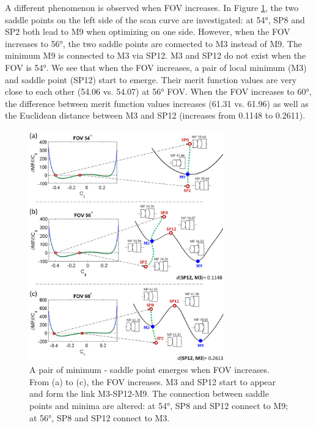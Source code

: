 \newpage
A different phenomenon is observed when FOV increases. In Figure \ref{fig:systemborn}, the two saddle points on the left side of the scan curve are investigated: at 54°, SP8 and SP2 both lead to M9 when optimizing on one side. However, when the FOV increases to 56°, the two saddle points are connected to M3 instead of M9. The minimum M9 is connected to M3 via SP12. M3 and SP12 do not exist when the FOV is 54°. We see that when the FOV increases, a pair of local minimum (M3) and saddle point (SP12) start to emerge. Their merit function values are very close to each other (54.06 vs. 54.07) at 56° FOV. When the FOV increases to 60°, the difference between merit function values increases (61.31 vs. 61.96) as well as the Euclidean distance between M3 and SP12 (increases from 0.1148 to 0.2611). 
\vspace*{-3mm}
\begin{figure}[h!]
    \centering
    \setlength{\belowcaptionskip}{-10pt}
    \setlength{\abovecaptionskip}{5pt}
    \includegraphics[width=0.75\textwidth]{chapter-3/figures/SystemBorn.png}
    \caption{A pair of minimum - saddle point emerges when FOV increases. From (a) to (c), the FOV increases. M3 and SP12 start to appear and form the link M3-SP12-M9. The connection between saddle points and minima are altered: at 54°, SP8 and SP12 connect to M9; at 56°, SP8 and SP12 connect to M3.}
    \label{fig:systemborn}
\end{figure}

